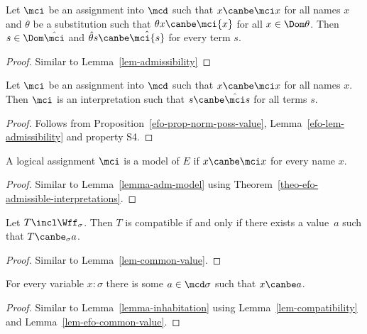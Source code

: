 \begin{lem}
  \label{efo-lem-admissibility}
  Let $\mci$ be an assignment into $\mcd$ such that $x \canbe \mci x$
  for all names $x$
  and $\theta$ be a
  substitution such that $\theta{x}\canbe\mci{x}$ for
  all $x\in\Dom\theta$.  Then $s\in\Dom\hat\mci$ and
  $\hat\theta{s}\canbe\hat\mci{s}$ for every term $s$.
\end{lem}
\begin{proof}
  Similar to Lemma~\ref{lem-admissibility}
\end{proof}

\begin{thm}
  \label{theo-efo-admissible-interpretations}
  Let $\mci$ be an assignment into $\mcd$ such that $x \canbe \mci x$
  for all names $x$.
  Then $\mci$ is an
  interpretation such that $s\canbe\hat\mci s$ for all terms $s$.
\end{thm}
\begin{proof}
  Follows from Proposition~\ref{efo-prop-norm-poss-value}, Lemma~\ref{efo-lem-admissibility} and property S4.
\end{proof}

\begin{lem}
  \label{lemma-efo-adm-model}
  A logical assignment $\mci$ is a model of $E$ if $x\canbe \mci x$
  for every name $x$.
\end{lem}
\begin{proof}  Similar to Lemma~\ref{lemma-adm-model}
  using Theorem~\ref{theo-efo-admissible-interpretations}.
\end{proof}

\begin{lem}
  \label{lem-efo-common-value}
  Let $T\incl\Wff_\sigma$.  Then $T$ is compatible if
  and only if there exists a value~$a$ such that
  $T\canbe_\sigma a$.
\end{lem}
\begin{proof}  Similar to Lemma~\ref{lem-common-value}.
\end{proof}

\begin{lem}[Admissibility]
  \label{lemma-efo-inhabitation}
  For every variable $x:\sigma$ there is some $a\in\mcd\sigma$
  such that $x\canbe a$.
\end{lem}
\begin{proof}  Similar to Lemma~\ref{lemma-inhabitation}
  using Lemma~\ref{lem-compatibility} and Lemma~\ref{lem-efo-common-value}.
\end{proof}

